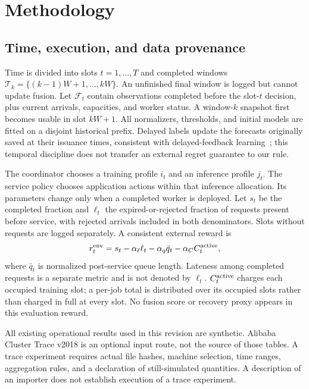 \section{Methodology}
\label{sec:methodology}

\subsection{Time, execution, and data provenance}
\label{sec:problem}

Time is divided into slots $t=1,\ldots,T$ and completed windows
$\mathcal T_k=\{(k-1)W+1,\ldots,kW\}$. An unfinished final window is logged
but cannot update fusion. Let $\mathcal F_t$ contain observations completed
before the slot-$t$ decision, plus current arrivals, capacities, and worker
status. A window-$k$ snapshot first becomes usable in slot $kW+1$.
All normalizers, thresholds, and initial models are fitted on a disjoint
historical prefix. Delayed labels update the forecasts originally saved at
their issuance times, consistent with delayed-feedback
learning~\cite{joulani2013}; this temporal discipline does not transfer an
external regret guarantee to our rule.

The coordinator chooses a training profile $i_t$ and an inference profile $j_t$.
The service policy chooses application actions within that inference allocation.
Its parameters change only when a completed worker is deployed. Let $s_t$ be
the completed fraction and $\ell_t$ the expired-or-rejected fraction of requests
present before service, with rejected arrivals included in both denominators.
Slots without requests are logged separately. A consistent external reward is
\begin{equation}
 r_t^{\rm env}=s_t-\alpha_\ell\ell_t-\alpha_q\bar q_t
                  -\alpha_C C_t^{\rm active},
 \label{eq:external-reward}
\end{equation}
where $\bar q_t$ is normalized post-service queue length. Lateness among completed
requests is a separate metric and is not denoted by $\ell_t$.
$C_t^{\rm active}$ charges each occupied training slot; a per-job total is
distributed over its occupied slots rather than charged in full at every slot.
No fusion score or recovery proxy appears in this evaluation reward.

All existing operational results used in this revision are synthetic. Alibaba
Cluster Trace v2018 is an optional input route, not the source of those tables.
A trace experiment requires actual file hashes, machine selection, time ranges,
aggregation rules, and a declaration of still-simulated quantities. A description
of an importer does not establish execution of a trace experiment.


